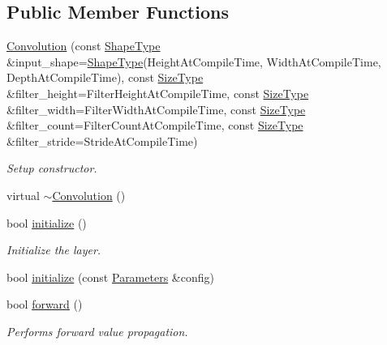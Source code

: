 \subsection*{Public Member Functions}
\begin{DoxyCompactItemize}
\item 
\hyperlink{classffnn_1_1layer_1_1_convolution_a01df2aca0a04c83124ab4042b281083b}{Convolution} (const \hyperlink{classffnn_1_1layer_1_1_convolution_af048fd677e8749bb295fac8d330ad843}{Shape\-Type} \&input\-\_\-shape=\hyperlink{classffnn_1_1layer_1_1_convolution_af048fd677e8749bb295fac8d330ad843}{Shape\-Type}(Height\-At\-Compile\-Time, Width\-At\-Compile\-Time, Depth\-At\-Compile\-Time), const \hyperlink{classffnn_1_1layer_1_1_convolution_a9599a1f35642eb9b9f516659507ae58d}{Size\-Type} \&filter\-\_\-height=Filter\-Height\-At\-Compile\-Time, const \hyperlink{classffnn_1_1layer_1_1_convolution_a9599a1f35642eb9b9f516659507ae58d}{Size\-Type} \&filter\-\_\-width=Filter\-Width\-At\-Compile\-Time, const \hyperlink{classffnn_1_1layer_1_1_convolution_a9599a1f35642eb9b9f516659507ae58d}{Size\-Type} \&filter\-\_\-count=Filter\-Count\-At\-Compile\-Time, const \hyperlink{classffnn_1_1layer_1_1_convolution_a9599a1f35642eb9b9f516659507ae58d}{Size\-Type} \&filter\-\_\-stride=Stride\-At\-Compile\-Time)
\begin{DoxyCompactList}\small\item\em Setup constructor. \end{DoxyCompactList}\item 
virtual \hyperlink{classffnn_1_1layer_1_1_convolution_a00d442f8b6293552172b9935b773fe60}{$\sim$\-Convolution} ()
\item 
bool \hyperlink{classffnn_1_1layer_1_1_convolution_a2ae5762f45886e132eef09c8550e950a}{initialize} ()
\begin{DoxyCompactList}\small\item\em Initialize the layer. \end{DoxyCompactList}\item 
bool \hyperlink{classffnn_1_1layer_1_1_convolution_a8453012cbe54e3482baf36de867a2b13}{initialize} (const \hyperlink{classffnn_1_1layer_1_1_convolution_afba43aa5946f49d3ffc306972ba11fff}{Parameters} \&config)
\item 
bool \hyperlink{classffnn_1_1layer_1_1_convolution_a09216fc4ade0c00c2ddf97e5eacadec1}{forward} ()
\begin{DoxyCompactList}\small\item\em Performs forward value propagation. \end{DoxyCompactList}\item 

\end{DoxyCompactItemize}
